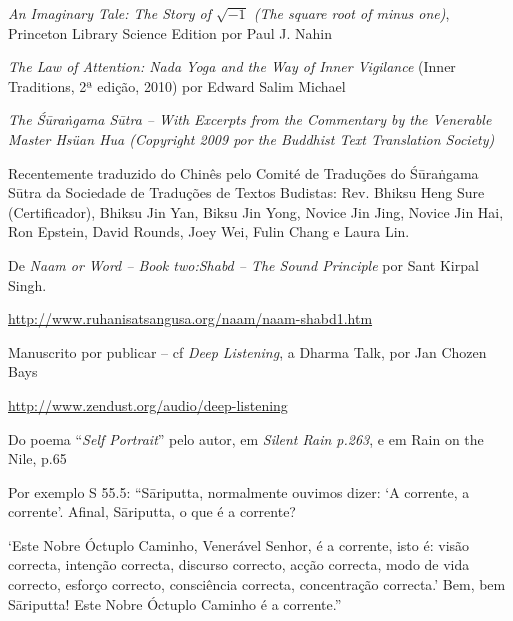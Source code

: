 \begin{thebibliography}{9}

 \emph{An Imaginary Tale: The Story of $\sqrt{-1}$ (The
    square root of minus one)}, Princeton Library Science Edition por Paul J.
  Nahin

 \emph{The Law of Attention: Nada Yoga and the Way of Inner
    Vigilance} (Inner Traditions, 2ª edição, 2010) por Edward Salim Michael
  
 \emph{The Śūraṅgama Sūtra -- With Excerpts from the
    Commentary by the Venerable Master Hsüan Hua (Copyright 2009 por the
    Buddhist Text Translation Society)}

  Recentemente traduzido do Chinês pelo Comité de Traduções do Śūraṅgama Sūtra
  da Sociedade de Traduções de Textos Budistas: Rev. Bhiksu Heng Sure
  (Certificador), Bhiksu Jin Yan, Biksu Jin Yong, Novice Jin Jing, Novice Jin
  Hai, Ron Epstein, David Rounds, Joey Wei, Fulin Chang e Laura Lin.

 De \emph{Naam or Word -- Book two:Shabd -- The Sound Principle}
  por Sant Kirpal Singh.

  {\footnotesize \url{http://www.ruhanisatsangusa.org/naam/naam-shabd1.htm}}

 Manuscrito por publicar -- cf \emph{Deep Listening}, a Dharma
  Talk, por Jan Chozen Bays

  {\footnotesize \url{http://www.zendust.org/audio/deep-listening}}
  
 Do poema ``\emph{Self Portrait}'' pelo autor, em \emph{Silent
    Rain p.263}, e em Rain on the Nile, p.65

 Por exemplo S 55.5: ``Sāriputta, normalmente ouvimos
  dizer: `A corrente, a corrente'. Afinal, Sāriputta, o que é a corrente?
  
  \enlargethispage{2\baselineskip}

  `Este Nobre Óctuplo Caminho, Venerável Senhor, é a corrente, isto é: visão
  correcta, intenção correcta, discurso correcto, acção correcta, modo de vida
  correcto, esforço correcto, consciência correcta, concentração correcta.' Bem,
  bem Sāriputta! Este Nobre Óctuplo Caminho é a corrente.''

\end{thebibliography}





